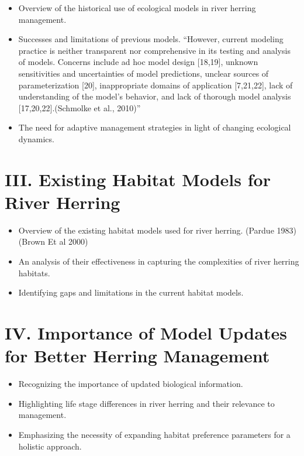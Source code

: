 \documentclass[
]{book}
\providecommand{\tightlist}{%
  \setlength{\itemsep}{0pt}\setlength{\parskip}{0pt}}
\begin{document}
\begin{itemize}
\tightlist
\item
  Overview of the historical use of ecological models in river herring management.
\item
  Successes and limitations of previous models.
  ``However, current modeling practice is neither transparent nor comprehensive in its testing and analysis of models. Concerns include ad hoc model design {[}18,19{]}, unknown sensitivities and uncertainties of model predictions, unclear sources of parameterization {[}20{]}, inappropriate domains of application {[}7,21,22{]}, lack of understanding of the model's behavior, and lack of thorough model analysis {[}17,20,22{]}.(Schmolke et al., 2010)''
\item
  The need for adaptive management strategies in light of changing ecological dynamics.
\end{itemize}

\hypertarget{iii.-existing-habitat-models-for-river-herring}{%
\section{III. Existing Habitat Models for River Herring}\label{iii.-existing-habitat-models-for-river-herring}}

\begin{itemize}
\tightlist
\item
  Overview of the existing habitat models used for river herring.
  (Pardue 1983)(Brown Et al 2000)
\item
  An analysis of their effectiveness in capturing the complexities of river herring habitats.
\item
  Identifying gaps and limitations in the current habitat models.
\end{itemize}

\hypertarget{iv.-importance-of-model-updates-for-better-herring-management}{%
\section{IV. Importance of Model Updates for Better Herring Management}\label{iv.-importance-of-model-updates-for-better-herring-management}}

\begin{itemize}
\tightlist
\item
  Recognizing the importance of updated biological information.
\item
  Highlighting life stage differences in river herring and their relevance to management.
\item
  Emphasizing the necessity of expanding habitat preference parameters for a holistic approach.
\end{itemize}
\end{document}

